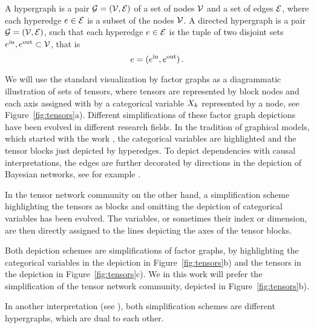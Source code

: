 \begin{definition}\label{def:hypergraphs}
	A hypergraph is a pair $\mathcal{G}=(\mathcal{V},\mathcal{E})$ of a set of nodes $\mathcal{V}$ and a set of edges $\mathcal{E}$, where each hyperedge $e\in\mathcal{E}$ is a subset of the nodes $\mathcal{V}$.
	A directed hypergraph is a pair $\mathcal{G}=(\mathcal{V},\mathcal{E})$, such that each hyperedge $e\in\mathcal{E}$ is the tuple of two disjoint sets $e^{\mathrm{in}},e^{\mathrm{out}}\subset\mathcal{V}$, that is
		\[ e = (e^{\mathrm{in}},e^{\mathrm{out}})  \, . \]
\end{definition}

We will use the standard visualization by factor graphs as a diagrammatic illustration of sets of tensors, where tensors are represented by block nodes and each axis assigned with by a categorical variable $X_{k}$ represented by a node, see Figure~\ref{fig:tensors}a).
Different simplifications of these factor graph depictions have been evolved in different research fields.
In the tradition of graphical models, which started with the work \cite{pearl_probabilistic_1988}, the categorical variables are highlighted and the tensor blocks just depicted by hyperedges.
To depict dependencies with causal interpretations, the edges are further decorated by directions in the depiction of Bayesian networks, see for example \cite{pearl_causality_2009}.

In the tensor network community on the other hand, a simplification scheme highlighting the tensors as blocks and omitting the depiction of categorical variables has been evolved.
The variables, or sometimes their index or dimension, are then directly assigned to the lines depicting the axes of the tensor blocks.

Both depiction schemes are simplifications of factor graphs, by highlighting the categorical variables in the depiction in Figure~\ref{fig:tensors}b) and the tensors in the depiction in Figure~\ref{fig:tensors}c).
We in this work will prefer the simplification of the tensor network community, depicted in Figure~\ref{fig:tensors}b).

In another interpretation (see \cite{robeva_duality_2019}), both simplification schemes are different hypergraphs, which are dual to each other.

